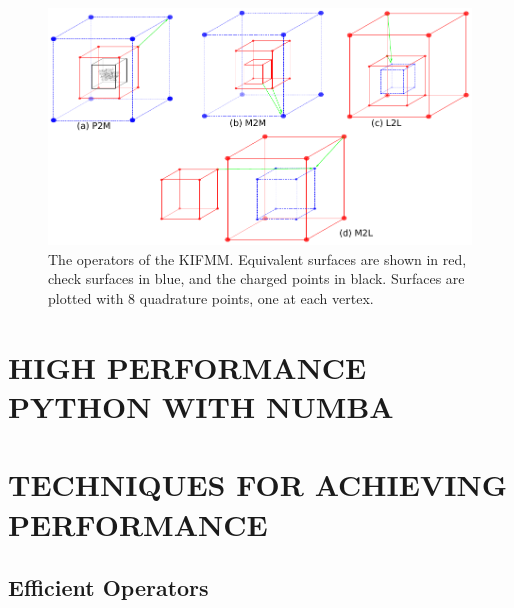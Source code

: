 \documentclass{IEEEcsmag}
\begin{document}
\begin{figure}
	\centerline{\includegraphics {figures/operators.pdf}}
	\caption{The operators of the KIFMM. Equivalent surfaces are shown in red, check surfaces in blue, and the charged points in black. Surfaces are plotted with 8 quadrature points, one at each vertex.}
	\label{fig:operators}
\end{figure}


\section{HIGH PERFORMANCE PYTHON WITH NUMBA}


\section{TECHNIQUES FOR ACHIEVING PERFORMANCE}


\subsection{Efficient Operators}
\end{document}
